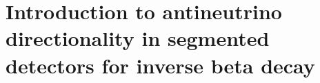 \documentclass[tightenlines,
twocolumn,prl,notitlepage,nofootinbib,preprintnumbers,longbibliography]{revtex4-1}
\begin{document}
\section{Introduction to antineutrino directionality in segmented detectors for inverse beta decay}



\end{document}
